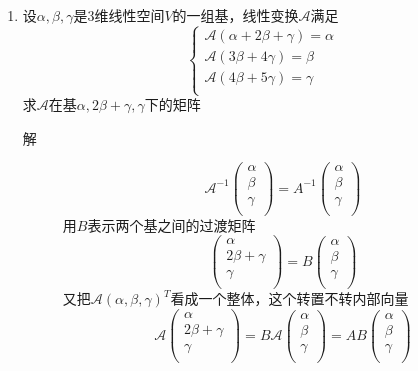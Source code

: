 \begin{enumerate}
\item 设$\alpha,\beta,\gamma$是$3$维线性空间$V$的一组基，线性变换$\mathcal{A}$满足
\[
\left\{
\begin{array}{l}
\mathcal{A}(\alpha+2\beta+\gamma) = \alpha \\
\mathcal{A}(3\beta+4\gamma) = \beta \\
\mathcal{A}(4\beta+5\gamma) = \gamma \\
\end{array}
\right.
\]
求$\mathcal{A}$在基$\alpha,2\beta+\gamma,\gamma$下的矩阵
\begin{description}
\item[解]
\[
\mathcal{A}^{-1}\left(
\begin{array}{c}
\alpha \\
\beta \\
\gamma \\
\end{array}\right) = A^{-1} \left(
\begin{array}{c}
\alpha \\
\beta \\
\gamma \\
\end{array}\right)
\]
用$B$表示两个基之间的过渡矩阵
\[
\left(
\begin{array}{c}
\alpha \\
2\beta+\gamma \\
\gamma \\
\end{array}\right) = B \left(
\begin{array}{c}
\alpha \\
\beta \\
\gamma \\
\end{array}\right)
\]
又把$\mathcal{A}(\alpha,\beta,\gamma)^T$看成一个整体，这个转置不转内部向量
\[
\mathcal{A}\left(
\begin{array}{c}
\alpha \\
2\beta+\gamma \\
\gamma \\
\end{array}\right) = B\mathcal{A}\left(
\begin{array}{c}
\alpha \\
\beta \\
\gamma \\
\end{array}\right) = AB \left(
\begin{array}{c}
\alpha \\
\beta \\
\gamma \\
\end{array}\right)
\]
\end{description}



\end{enumerate}
